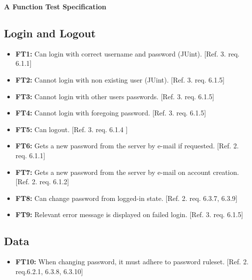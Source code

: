 \documentclass{article}
\begin{document}
	\newpage
		\begin{flushleft}
		{\large \textbf{A Function Test Specification}}
		\end{flushleft}
		
		\subsection{Login and Logout}
		
		\begin{itemize}
  			\item \textbf{FT1:} Can login with correct username and password (JUint). [Ref. 3. req. 6.1.1]	
			
			\item \textbf{FT2:} Cannot login with non existing user (JUint). [Ref. 3. req. 6.1.5]
			
			\item \textbf{FT3:} Cannot login with other users passwords. [Ref. 3. req. 6.1.5]
			
			\item \textbf{FT4:} Cannot login with foregoing password. [Ref. 3. req. 6.1.5]
				
			\item \textbf{FT5:} Can logout. [Ref. 3. req. 6.1.4 ]
			
  			\item \textbf{FT6:} Gets a new password from the server by e-mail if requested. [Ref. 2. req. 6.1.1]
  			\item \textbf{FT7:} Gets a new password from the server by e-mail on account creation. [Ref. 2. req. 6.1.2]
  					
  			\item \textbf{FT8:} Can change password from logged-in state. [Ref. 2. req. 6.3.7, 6.3.9]

  			\item \textbf{FT9:} Relevant error message is displayed on failed login. [Ref. 3. req. 6.1.5] 
		\end{itemize}
		
		\subsection{Data}
		
		\begin{itemize}
		
  			\item \textbf{FT10:}  When changing password, it must adhere to password ruleset. [Ref. 2. req.6.2.1, 6.3.8, 6.3.10]

		\end{itemize}
		
\end{document}

